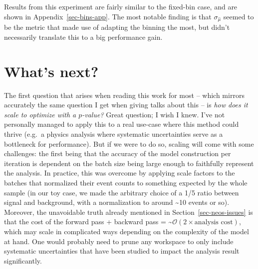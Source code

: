 \documentclass[
  11pt,
  numbers=noendperiod]{book}
\begin{document}
Results from this experiment are fairly similar to the fixed-bin case,
and are shown in Appendix~\ref{sec-bins-app}. The most notable finding
is that \(\sigma_{\hat{\mu}}\) seemed to be the metric that made use of
adapting the binning the most, but didn't necessarily translate this to
a big performance gain.

\hypertarget{whats-next}{%
\section{What's next?}\label{whats-next}}

The first question that arises when reading this work for most -- which
mirrors accurately the same question I get when giving talks about this
-- is \emph{how does it scale to optimize with a \(p\)-value?} Great
question; I wish I knew. I've not personally managed to apply this to a
real use-case where this method could thrive (e.g.~a physics analysis
where systematic uncertainties serve as a bottleneck for performance).
But if we were to do so, scaling will come with some challenges: the
first being that the accuracy of the model construction per iteration is
dependent on the batch size being large enough to faithfully represent
the analysis. In practice, this was overcome by applying scale factors
to the batches that normalized their event counts to something expected
by the whole sample (in our toy case, we made the arbitrary choice of a
1/5 ratio between signal and background, with a normalization to around
\textasciitilde10 events or so). Moreover, the unavoidable truth already
mentioned in Section~\ref{sec-neos-issues} is that the cost of the
forward pass + backward pass =
\textasciitilde{}\(\mathcal{O}(2\times \text{analysis cost})\), which
may scale in complicated ways depending on the complexity of the model
at hand. One would probably need to prune any workspace to only include
systematic uncertainties that have been studied to impact the analysis
result significantly.
\end{document}
